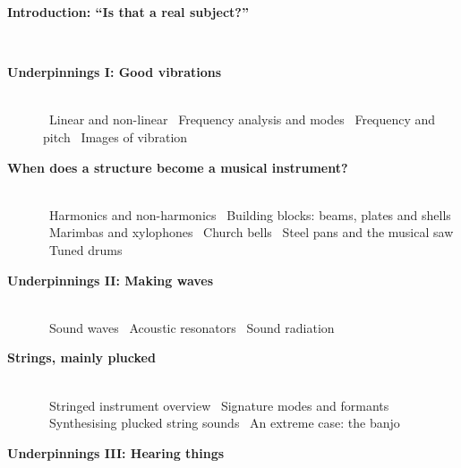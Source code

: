 \begin{description}\item[\hspace{-1cm}\pageref{s:80aa9fe9}\hspace{+0cm} \large\bf\sf \blu Introduction: “Is that a real subject?”]\hfill \\ 
\item[\hspace{-1cm}\pageref{s:4e1e7b0a}\hspace{+0cm} \large\bf\sf \blu Underpinnings I: Good vibrations]\hfill \\ 
\quad{\gre{}\pageref{s:cb664fff}}~Linear and non-linear
\quad{\gre{}\pageref{s:b3cc2a63}}~Frequency analysis and modes
\quad{\gre{}\pageref{s:1ac2ac62}}~Frequency and pitch
\quad{\gre{}\pageref{s:71d6691f}}~Images of vibration
\item[\hspace{-1cm}\pageref{s:ede3de60}\hspace{+0cm} \large\bf\sf \blu When does a structure become a musical instrument?]\hfill \\ 
\quad{\gre{}\pageref{s:c2ad3a14}}~Harmonics and non-harmonics
\quad{\gre{}\pageref{s:cc77132d}}~Building blocks: beams, plates and shells
\quad{\gre{}\pageref{s:040aaef9}}~Marimbas and xylophones
\quad{\gre{}\pageref{s:771b6e96}}~Church bells
\quad{\gre{}\pageref{s:f3662a4b}}~Steel pans and the musical saw
\quad{\gre{}\pageref{s:b7408339}}~Tuned drums
\item[\hspace{-1cm}\pageref{s:c979ca30}\hspace{+0cm} \large\bf\sf \blu Underpinnings II: Making waves]\hfill \\ 
\quad{\gre{}\pageref{s:31003940}}~Sound waves
\quad{\gre{}\pageref{s:9cc30fa1}}~Acoustic resonators
\quad{\gre{}\pageref{s:f00c42f7}}~Sound radiation
\item[\hspace{-1cm}\pageref{s:3c116382}\hspace{+0cm} \large\bf\sf \blu Strings, mainly plucked]\hfill \\ 
\quad{\gre{}\pageref{s:e48b9b3f}}~Stringed instrument overview
\quad{\gre{}\pageref{s:598ef75a}}~Signature modes and formants
\quad{\gre{}\pageref{s:e2bec8d9}}~Synthesising plucked string sounds
\quad{\gre{}\pageref{s:f209e820}}~An extreme case: the banjo
\item[\hspace{-1cm}\pageref{s:6036bea2}\hspace{+0cm} \large\bf\sf \blu Underpinnings III: Hearing things]\hfill \\ 

\end{description}
